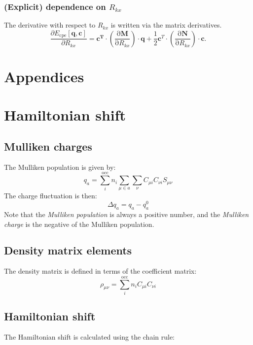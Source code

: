\documentclass{article}
\numberwithin{equation}{section}
\begin{document}
\subsubsection{(Explicit) dependence on $R_{kx}$}
The derivative with respect to $R_{kx}$ is written via the matrix derivatives.
\begin{equation}
    \frac{\partial E_\mathrm{{cpe}}\left[\mathbf{q}, \mathbf{c}\right]}{\partial R_{kx}} = 
    \mathbf{c^T} \cdot \left( \frac{\mathrm{\partial}\mathbf{M}}{\mathrm{\partial}R_{kx}}\right) \cdot \mathbf{q} 
    + \frac{1}{2}\mathbf{c}^T \cdot \left( \frac{\mathrm{\partial}\mathbf{N}}{\mathrm{\partial}R_{kx}}\right) \cdot \mathbf{c}. 
\end{equation}




\clearpage
\section*{Appendices}
\appendix
\section{Hamiltonian shift}

\subsection{Mulliken charges}
The Mulliken population is given by:
\begin{equation}
    q_a = \sum_i^\mathrm{occ} n_i \sum_{\mu \in a} \sum_{\nu}
    C_{\mu i} C_{\nu i} S_{\mu\nu}
\end{equation}
The charge fluctuation is then: 
\begin{equation}
    \Delta q_a = q_a - q_a^0
\end{equation}
Note that the \textit{Mulliken population} is always a positive number, and the \textit{Mulliken charge} is the negative of the Mulliken population.
\subsection{Density matrix elements}
The density matrix is defined in terms of the coefficient matrix:
\begin{equation}
    \rho_{\mu\nu} = \sum_i^\mathrm{occ} n_i C_{\mu i} C_{\nu i}
\end{equation}

\subsection{Hamiltonian shift}
The Hamiltonian shift is calculated using the chain rule:
\end{document}

